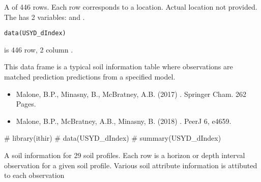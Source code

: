 \documentclass[a4paper]{book}
\begin{document}
%
\begin{Description}
A  of 446 rows. Each row corresponds to a location. Actual location not provided. The  has 2 variables:  and .
\end{Description}
%
\begin{Usage}
\begin{verbatim}
data(USYD_dIndex)
\end{verbatim}
\end{Usage}
%
\begin{Format}
 is 446 row, 2 column . 
\end{Format}
%
\begin{Details}
This data frame is a typical soil information table where observations are matched prediction predictions from a specified model.
\end{Details}
%
\begin{References}
\begin{itemize}

\item{} Malone, B.P., Minasny, B., McBratney, A.B. (2017) . Springer Cham. 262 Pages.
\item{} Malone, B.P.,  McBratney, A.B., Minasny, B. (2018) . PeerJ 6, e4659.


\end{itemize}

\end{References}
%
\begin{Examples}
\begin{ExampleCode}

# library(ithir)
# data(USYD_dIndex)
# summary(USYD_dIndex)

\end{ExampleCode}
\end{Examples}
%
\begin{Description}
A soil information  for 29 soil profiles. Each row is a horizon or depth interval observation for a given soil profile. Various soil attribute information is attibuted to each observation 
\end{Description}
\end{document}
